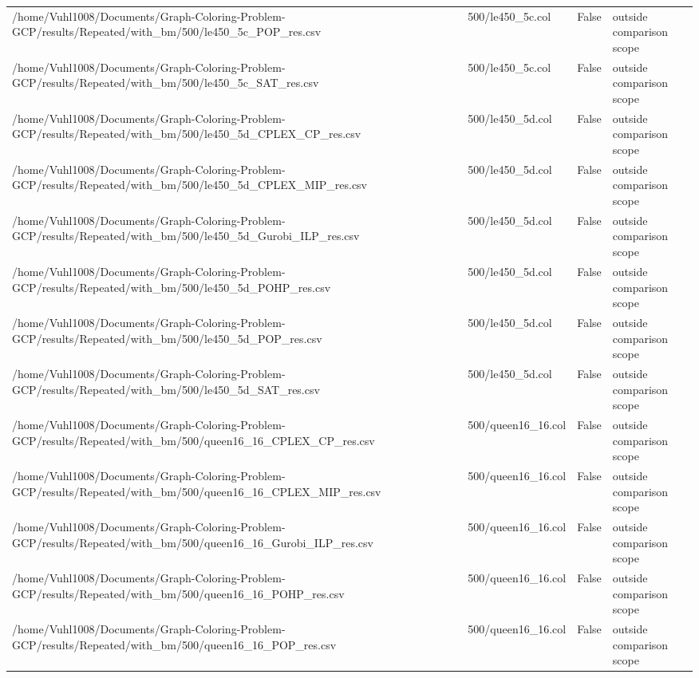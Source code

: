 \begin{table}[htbp]
\begin{tabular}{llll}
/home/Vuhl1008/Documents/Graph-Coloring-Problem-GCP/results/Repeated/with\_bm/500/le450\_5c\_POP\_res.csv & 500/le450\_5c.col & False & outside comparison scope \\
/home/Vuhl1008/Documents/Graph-Coloring-Problem-GCP/results/Repeated/with\_bm/500/le450\_5c\_SAT\_res.csv & 500/le450\_5c.col & False & outside comparison scope \\
/home/Vuhl1008/Documents/Graph-Coloring-Problem-GCP/results/Repeated/with\_bm/500/le450\_5d\_CPLEX\_CP\_res.csv & 500/le450\_5d.col & False & outside comparison scope \\
/home/Vuhl1008/Documents/Graph-Coloring-Problem-GCP/results/Repeated/with\_bm/500/le450\_5d\_CPLEX\_MIP\_res.csv & 500/le450\_5d.col & False & outside comparison scope \\
/home/Vuhl1008/Documents/Graph-Coloring-Problem-GCP/results/Repeated/with\_bm/500/le450\_5d\_Gurobi\_ILP\_res.csv & 500/le450\_5d.col & False & outside comparison scope \\
/home/Vuhl1008/Documents/Graph-Coloring-Problem-GCP/results/Repeated/with\_bm/500/le450\_5d\_POHP\_res.csv & 500/le450\_5d.col & False & outside comparison scope \\
/home/Vuhl1008/Documents/Graph-Coloring-Problem-GCP/results/Repeated/with\_bm/500/le450\_5d\_POP\_res.csv & 500/le450\_5d.col & False & outside comparison scope \\
/home/Vuhl1008/Documents/Graph-Coloring-Problem-GCP/results/Repeated/with\_bm/500/le450\_5d\_SAT\_res.csv & 500/le450\_5d.col & False & outside comparison scope \\
/home/Vuhl1008/Documents/Graph-Coloring-Problem-GCP/results/Repeated/with\_bm/500/queen16\_16\_CPLEX\_CP\_res.csv & 500/queen16\_16.col & False & outside comparison scope \\
/home/Vuhl1008/Documents/Graph-Coloring-Problem-GCP/results/Repeated/with\_bm/500/queen16\_16\_CPLEX\_MIP\_res.csv & 500/queen16\_16.col & False & outside comparison scope \\
/home/Vuhl1008/Documents/Graph-Coloring-Problem-GCP/results/Repeated/with\_bm/500/queen16\_16\_Gurobi\_ILP\_res.csv & 500/queen16\_16.col & False & outside comparison scope \\
/home/Vuhl1008/Documents/Graph-Coloring-Problem-GCP/results/Repeated/with\_bm/500/queen16\_16\_POHP\_res.csv & 500/queen16\_16.col & False & outside comparison scope \\
/home/Vuhl1008/Documents/Graph-Coloring-Problem-GCP/results/Repeated/with\_bm/500/queen16\_16\_POP\_res.csv & 500/queen16\_16.col & False & outside comparison scope \\

\end{tabular}
\end{table}
